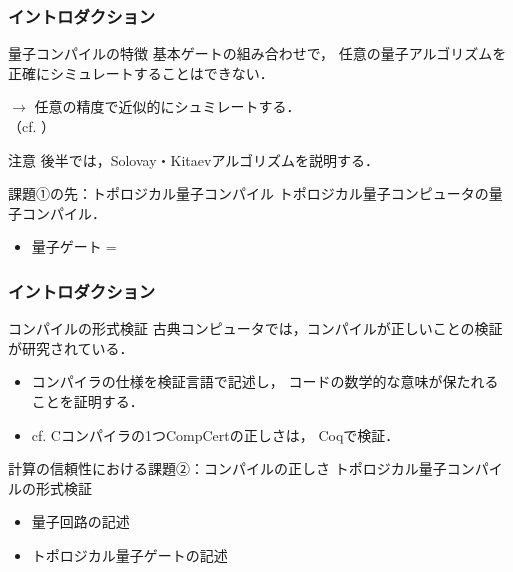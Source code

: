 \documentclass{beamer} %
\newcommand{\0}{\mathbf{0}}
\newcommand{\1}{\mathbf{1}}
\newcommand{\2}{\mathbf{2}}
\begin{document}
\begin{frame}
  \frametitle{イントロダクション}
  \begin{block}{量子コンパイルの特徴}
    基本ゲートの組み合わせで，
    任意の量子アルゴリズムを
    \alert{正確に}シミュレートすることはできない．
    \begin{center}
      \(\longrightarrow\)
      任意の精度で\alert{近似的に}シュミレートする．\\
      （cf. ）
    \end{center}
  \end{block}

  \begin{alertblock}{注意}
    後半では，Solovay・Kitaevアルゴリズムを説明する．
  \end{alertblock}

  \begin{block}{課題①の先：トポロジカル量子コンパイル}
    トポロジカル量子コンピュータの量子コンパイル．
    \begin{itemize}
      \item 量子ゲート\(=\)
    \end{itemize}
  \end{block}
\end{frame}

\begin{frame}
  \frametitle{イントロダクション}
  \begin{block}{コンパイルの形式検証}
    古典コンピュータでは，コンパイルが正しいことの検証が研究されている．
    \begin{itemize}
      \item コンパイラの仕様を検証言語で記述し，
            コードの数学的な意味が保たれることを証明する．
      \item cf. Cコンパイラの1つCompCertの正しさは，
            Coqで検証．
    \end{itemize}
  \end{block}
  \begin{alertblock}{計算の信頼性における課題②：コンパイルの正しさ}
    トポロジカル量子コンパイルの形式検証
    \begin{itemize}
      \item 量子回路の記述
      \item トポロジカル量子ゲートの記述
    \end{itemize}
  \end{alertblock}
\end{frame}
\end{document}
